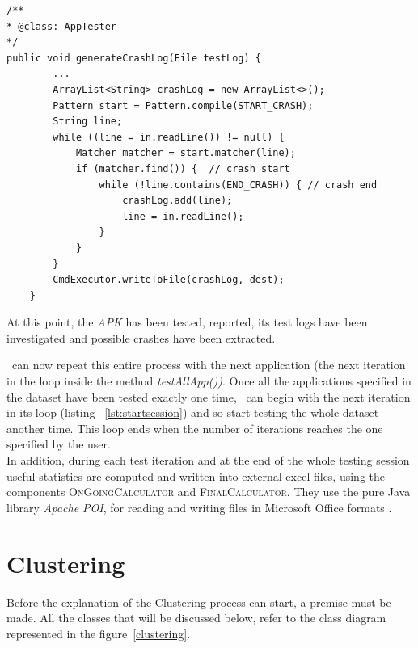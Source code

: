 \begin{lstlisting}[caption=\AppTester's method for extracting a crash log from its test log,label={lst:generatecrash}]
/**
* @class: AppTester
*/
public void generateCrashLog(File testLog) {
        ...
        ArrayList<String> crashLog = new ArrayList<>();
        Pattern start = Pattern.compile(START_CRASH);
        String line;
        while ((line = in.readLine()) != null) {
            Matcher matcher = start.matcher(line);
            if (matcher.find()) {  // crash start
                while (!line.contains(END_CRASH)) { // crash end
                    crashLog.add(line);
                    line = in.readLine();
                }
            }
        }
        CmdExecutor.writeToFile(crashLog, dest);
    }
\end{lstlisting} 
At this point, the \textit{APK} has been tested, reported, its test logs have been investigated and possible crashes have been extracted. %



\toolname\ can now repeat this entire process with the next application (\ie the next iteration in the loop inside the method \textit{testAllApp())}. 
Once all the applications specified in the dataset have been tested exactly one time, \SessionLauncher\ can begin with the next iteration in its loop (listing ~\ref{lst:startsession}) and so start testing the whole dataset another time. 
This loop ends when the number of iterations reaches the one specified by the user. \\
In addition, during each test iteration and at the end of the whole testing session useful statistics are computed and written into external excel files, using the components \textsc{OnGoingCalculator} and \textsc{FinalCalculator}. They use the pure Java library \textit{Apache POI}, for reading and writing files in Microsoft Office formats \cite{apachepoi}. 




\section{Clustering}
\label{tool: clustering}
Before the explanation of the Clustering process can start, a premise must be made. All the classes that will be discussed below, refer to the class diagram represented in the figure~\ref{clustering}. 


